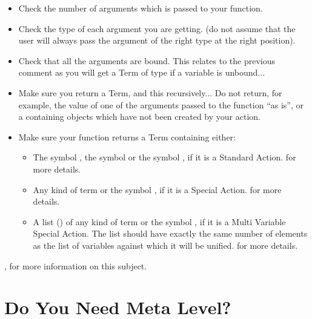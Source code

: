 \begin{itemize}

\item Check the number of arguments which is passed to your function.

\item Check the type of each argument you are getting. (do not assume
that the user will always pass the argument of the right type at the
right position).

\item Check that all the arguments are bound. This relates to the previous
comment as you will get a Term of type  if a variable is
unbound...

\item Make sure you return a  Term, and this recursively...
Do not return, for example, the value of one of the arguments passed to the function
``as is'', or a  containing objects which have not been created
by your action.

\item Make sure your function returns a Term containing either:

\begin{itemize}

\item The symbol , the symbol  or the symbol
, if it is a Standard Action.  for more
details.

\item Any kind of term or the symbol , if it is a Special
Action.  for more details.

\item A list () of any kind of term or the symbol , if it
is a Multi Variable Special Action. The list should have exactly the same
number of elements as the list of variables against which it will be unified.
 for more details.

\end{itemize}
\end{itemize}

, for more information
on this subject.

\section{Do You Need Meta Level?}

